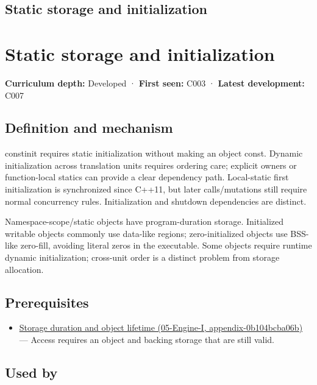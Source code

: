 \hypertarget{appendix-17c93c4c2f19}{}
\section*{Static storage and initialization}
\chapter{Static storage and initialization}\label{appendix-17c93c4c2f19-static-storage-and-initialization}

\textbf{Curriculum depth:} Developed · \textbf{First seen:} C003 · \textbf{Latest development:} C007

\section{Definition and mechanism}\label{appendix-17c93c4c2f19-definition-and-mechanism}

constinit requires static initialization without making an object const. Dynamic initialization across translation units requires ordering care; explicit owners or function-local statics can provide a clear dependency path. Local-static first initialization is synchronized since C++11, but later calls/mutations still require normal concurrency rules. Initialization and shutdown dependencies are distinct.

Namespace-scope/static objects have program-duration storage. Initialized writable objects commonly use data-like regions; zero-initialized objects use BSS-like zero-fill, avoiding literal zeros in the executable. Some objects require runtime dynamic initialization; cross-unit order is a distinct problem from storage allocation.

\section{Prerequisites}\label{appendix-17c93c4c2f19-prerequisites}

\begin{itemize}
\tightlist
\item
  \href{../05-Engine-I/main.pdf\#nameddest=appendix-0b104bcba06b}{Storage duration and object lifetime (05-Engine-I, appendix-0b104bcba06b)} --- Access requires an object and backing storage that are still valid.
\end{itemize}

\section{Used by}\label{appendix-17c93c4c2f19-used-by}

